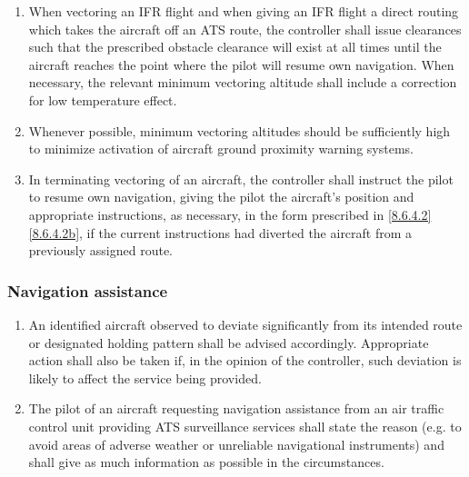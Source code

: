 \begin{enumerate}
    \item When vectoring an IFR flight and when giving an IFR flight a direct routing which takes the aircraft off an ATS route, the controller shall issue clearances such that the prescribed obstacle clearance will exist at all times until the aircraft reaches the point where the pilot will resume own navigation. When necessary, the relevant minimum vectoring altitude shall include a correction for low temperature effect.
    \item Whenever possible, minimum vectoring altitudes should be sufficiently high to minimize activation of aircraft ground proximity warning systems.
    

    \item \label{8.6.5.5} In terminating vectoring of an aircraft, the controller shall instruct the pilot to resume own navigation, giving the pilot the aircraft's position and appropriate instructions, as necessary, in the form prescribed in \ref{8.6.4.2} \ref{8.6.4.2b}, if the current instructions had diverted the aircraft from a previously assigned route.
\end{enumerate}

\subsubsection{Navigation assistance}

\begin{enumerate}
    \item An identified aircraft observed to deviate significantly from its intended route or designated holding pattern shall be advised accordingly. Appropriate action shall also be taken if, in the opinion of the controller, such deviation is likely to affect the service being provided.
    \item The pilot of an aircraft requesting navigation assistance from an air traffic control unit providing ATS surveillance services shall state the reason (e.g. to avoid areas of adverse weather or unreliable navigational instruments) and shall give as much information as possible in the circumstances.
\end{enumerate}

